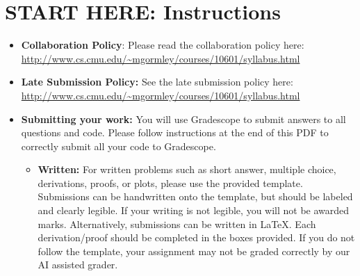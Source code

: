 \documentclass[11pt,addpoints,answers]{exam}
\begin{document}
\section*{START HERE: Instructions}
\begin{itemize}

\item \textbf{Collaboration Policy}: Please read the collaboration policy here: \url{http://www.cs.cmu.edu/~mgormley/courses/10601/syllabus.html}

\item\textbf{Late Submission Policy:} See the late submission policy here: \url{http://www.cs.cmu.edu/~mgormley/courses/10601/syllabus.html}

\item\textbf{Submitting your work:} You will use Gradescope to submit
  answers to all questions and code. Please
  follow instructions at the end of this PDF to correctly submit all your code to Gradescope.

  \begin{itemize}
    

    
   \item \textbf{Written:} For written problems such as short answer, multiple choice, derivations, proofs, or plots, please use the provided template. Submissions can be handwritten onto the template, but should be labeled and clearly legible. If your writing is not legible, you will not be awarded marks. Alternatively, submissions can be written in LaTeX. 
   Each derivation/proof should be completed in the boxes provided. If you do not follow the template, your assignment may not be graded correctly by our AI assisted grader.


\end{itemize}
\end{itemize}
\end{document}
